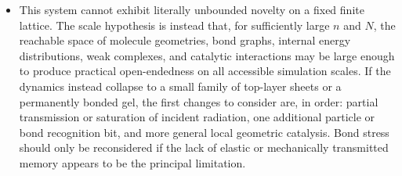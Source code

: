 \documentclass[12pt,letterpaper]{article}
\newcommand{\mb}{\mathbf}
\begin{document}
\begin{itemize}
\item This system cannot exhibit literally unbounded novelty on a fixed finite lattice. The scale hypothesis is instead that, for sufficiently large $n$ and $N$, the reachable space of molecule geometries, bond graphs, internal energy distributions, weak complexes, and catalytic interactions may be large enough to produce practical open-endedness on all accessible simulation scales. If the dynamics instead collapse to a small family of top-layer sheets or a permanently bonded gel, the first changes to consider are, in order: partial transmission or saturation of incident radiation, one additional particle or bond recognition bit, and more general local geometric catalysis. Bond stress should only be reconsidered if the lack of elastic or mechanically transmitted memory appears to be the principal limitation.
\end{itemize}

\end{document}
